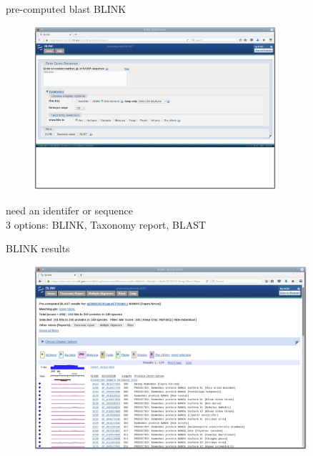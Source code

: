 \documentclass[pdf]{beamer}
\begin{document}
\begin{frame}{pre-computed blast}
  BLINK
  \begin{figure}[ht]
    \includegraphics[width=0.8\textwidth]{images/ncbi_blink_1}
  \end{figure}
  
  \small need an identifer or sequence\\
  3 options: BLINK, Taxonomy report, BLAST
\end{frame}

\begin{frame}{BLINK results}
  \begin{figure}[ht]
    \includegraphics[width=0.9\textwidth]{images/ncbi_blink_2}
  \end{figure}
\end{frame}
\end{document}
